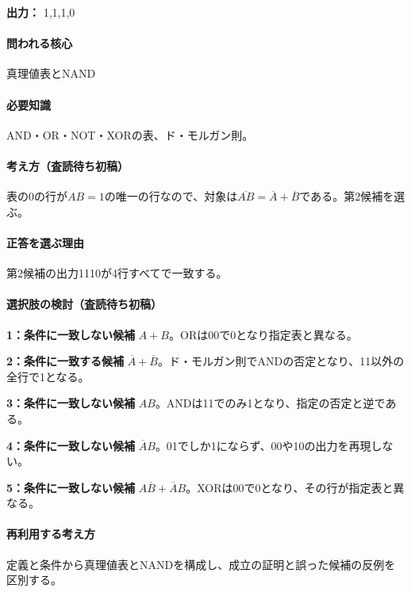 \noindent\textbf{出力：} 1,1,1,0\par

\paragraph{問われる核心} 真理値表とNAND

\paragraph{必要知識} AND・OR・NOT・XORの表、ド・モルガン則。

\paragraph{考え方（査読待ち初稿）} 表の0の行が\(AB=1\)の唯一の行なので、対象は\(\overline{AB}=\overline A+\overline B\)である。第2候補を選ぶ。

\paragraph{正答を選ぶ理由} 第2候補の出力1110が4行すべてで一致する。

\paragraph{選択肢の検討（査読待ち初稿）}\mbox{}\par

\noindent\textbf{1：条件に一致しない候補} \(A+B\)。ORは00で0となり指定表と異なる。\par

\noindent\textbf{2：条件に一致する候補} \(\overline A+\overline B\)。ド・モルガン則でANDの否定となり、11以外の全行で1となる。\par

\noindent\textbf{3：条件に一致しない候補} \(AB\)。ANDは11でのみ1となり、指定の否定と逆である。\par

\noindent\textbf{4：条件に一致しない候補} \(\overline A B\)。01でしか1にならず、00や10の出力を再現しない。\par

\noindent\textbf{5：条件に一致しない候補} \(A\overline B+\overline A B\)。XORは00で0となり、その行が指定表と異なる。\par

\paragraph{再利用する考え方} 定義と条件から真理値表とNANDを構成し、成立の証明と誤った候補の反例を区別する。

